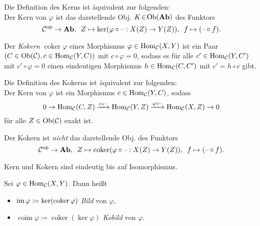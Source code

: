 \documentclass{cheat-sheet}
\DeclareMathOperator{\coker}{coker} %
\DeclareMathOperator{\coim}{coim} %
\begin{document}
\begin{bem}
  Die Definition des Kerns ist äquivalent zur folgenden: \\
  Der Kern von $\varphi$ ist das darstellende Obj. $K \!\in\! \operatorname{Ob}(\mathbf{Ab})$ des Funktors
  \[
    \mathcal{C}^{\mathrm{op}} \to \mathbf{Ab}, \enspace
    Z \mapsto \ker(\varphi \circ \text{--} : X(Z) \to Y(Z)), \enspace
    f \mapsto (\text{--} \circ f).
  \]
\end{bem}


\begin{defn}
  Der \emph{Kokern} $\coker \varphi$ eines Morphismus $\varphi \in \operatorname{Hom}_{\mathcal{C}}(X, Y)$ ist ein Paar $(C \in \operatorname{Ob}(\mathcal{C}), c \in \operatorname{Hom}_{\mathcal{C}}(Y, C))$ mit $c \circ \varphi = 0$, sodass es für alle $c' \in \operatorname{Hom}_{\mathcal{C}}(Y, C')$ mit $c' \circ \varphi = 0$ einen eindeutigen Morphismus $h \in \operatorname{Hom}_{\mathcal{C}}(C, C')$ mit $c' = h \circ c$ gibt.
\end{defn}


\begin{bem}
  Die Definition des Kokerns ist äquivalent zur folgenden: \\
  Der Kern von $\varphi$ ist ein Morphismus $c \in \operatorname{Hom}_{\mathcal{C}}(Y, C)$, sodass
  \[ 0 \to \operatorname{Hom}_{\mathcal{C}}(C, Z) \xrightarrow{c \circ \text{--}} \operatorname{Hom}_{\mathcal{C}}(Y, Z) \xrightarrow{\varphi \circ \text{--}} \operatorname{Hom}_{\mathcal{C}}(X, Z) \to 0 \]
  für alle $Z \in \operatorname{Ob}(\mathcal{C})$ exakt ist.
\end{bem}

\begin{acht}
  Der Kokern ist \textit{nicht} das darstellende Obj. des Funktors
  \[
    \Cat^\op \to \AbGrp, \enspace
    Z \mapsto \coker(\varphi \circ \blank : X(Z) \to Y(Z)), \enspace
    f \mapsto (\blank \circ f).
  \]
\end{acht}

\begin{bem}
  Kern und Kokern sind eindeutig bis auf Isomorphismus.
\end{bem}

\begin{defn}
  Sei $\varphi \in \operatorname{Hom}_{\mathcal{C}}(X, Y)$. Dann heißt
  \begin{itemize}
    \item $\im \varphi \coloneqq \ker(\coker \varphi)$ \emph{Bild} von $\varphi$,
    \item $\coim \varphi \coloneqq \coker(\ker \varphi)$ \emph{Kobild} von $\varphi$.
  \end{itemize}
\end{defn}
\end{document}
